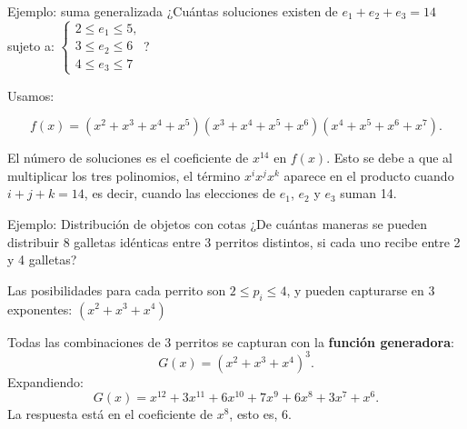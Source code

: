 \begin{exampleblock}{Ejemplo: suma generalizada}
¿Cuántas soluciones existen de $e_1 + e_2 + e_3 = 14$ sujeto a:
$\left\{\begin{array}{l} 2\leq e_1\leq 5,\\ 3\leq e_2\leq 6\\
  4\leq e_3\leq 7\end{array}\right.$?

Usamos:

$$
f(x) = (x^2 + x^3 + x^4 + x^5)(x^3 + x^4 + x^5 + x^6)(x^4 + x^5 + x^6 + x^7).
$$

El número de soluciones es el coeficiente de $x^{14}$ en $f(x)$. Esto se debe a que al multiplicar los tres polinomios, el término $x^i x^j x^k$ aparece en el producto cuando $i + j + k = 14$, es decir, cuando las elecciones de $e_1$, $e_2$ y $e_3$ suman 14.


\end{exampleblock}

\begin{exampleblock}{Ejemplo: Distribución de objetos con cotas}
¿De cuántas maneras se pueden distribuir 8 galletas idénticas entre 3 perritos distintos, si cada uno recibe entre 2 y 4 galletas?

Las posibilidades para cada perrito son $2\leq p_i\leq 4$, y pueden capturarse en $3$ exponentes: $(x^2+x^3+x^4)$

Todas las combinaciones de $3$ perritos se capturan con la \textbf{funci\'on generadora}:
$$
G(x) = (x^2 + x^3 + x^4)^3.
$$
Expandiendo:
$$
G(x) = x^{12} + 3x^{11} + 6x^{10} + 7x^9 + \boxed{6x^8} + 3x^7 + x^6.
$$
La respuesta est\'a en el coeficiente de $x^8$, esto es, $6$. 
\end{exampleblock}



\newcommand{\circledone}{\textcolor{blue}{\raisebox{.5pt}{\textcircled{\raisebox{-.9pt} {\small 1}}}}}
\newcommand{\circledtwo}{\textcolor{red}{\raisebox{.5pt}{\textcircled{\raisebox{-.9pt} {\small 2}}}}}
\newcommand{\circledfive}{\textcolor{green!60!black}{\raisebox{.5pt}{\textcircled{\raisebox{-.9pt} {\small 5}}}}}

